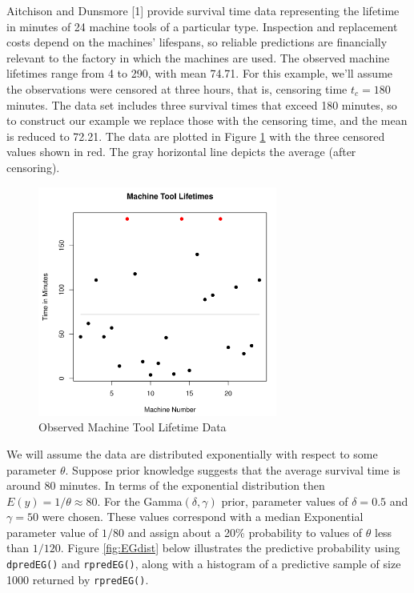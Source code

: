 \documentclass[12pt, a4paper]{article}
\begin{document}
\noindent Aitchison and Dunsmore [1] provide survival time data representing the lifetime in minutes of 24 machine tools of a particular type. Inspection and replacement costs depend on the machines' lifespans, so reliable predictions are financially relevant to the factory in which the machines are used. The observed machine lifetimes range from 4 to 290, with mean 74.71.  For this example, we'll assume the observations were censored at three hours, that is, censoring time $t_c = 180$ minutes.  The data set includes three survival times that exceed 180 minutes, so to construct our example we replace those with the censoring time, and the mean is reduced to 72.21.  The data are plotted in Figure \ref{fig:EG_Data} with the three censored values shown in red.  The gray horizontal line depicts the average (after censoring).

\begin{figure}[h]
  \centering
  \includegraphics[width=0.7\textwidth]{./Graphics/ExamplePlots/EG_TimeData}
  \caption{Observed Machine Tool Lifetime Data}
  \label{fig:EG_Data}
\end{figure}

\vspace{2cm}


\noindent We will assume the data are distributed exponentially with respect to some parameter $\theta$.  Suppose prior knowledge suggests that the average survival time is around 80 minutes.  In terms of the exponential distribution then $E(y) = 1/\theta \approx 80$.  For the Gamma$(\delta,\gamma)$ prior, parameter values of $\delta = 0.5$ and $\gamma=50$ were chosen. These values correspond with a median Exponential parameter value of $1/80$ and assign about a 20\% probability to values of $\theta$ less than $1/120$. Figure \ref{fig:EGdist} below illustrates the predictive probability using \texttt{dpredEG()} and \texttt{rpredEG()}, along with a histogram of a predictive sample of size 1000 returned by \texttt{rpredEG()}.\\
\end{document}
